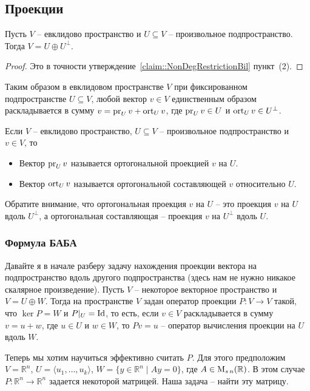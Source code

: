 \subsection{Проекции}

\begin{claim}
Пусть $V$ -- евклидово пространство и $U\subseteq V$ -- произвольное подпространство. Тогда $V = U\oplus U^\bot$.
\end{claim}
\begin{proof}
Это в точности утверждение~\ref{claim::NonDegRestrictionBil} пункт~(2).
\end{proof}

Таким образом в евклидовом пространстве $V$ при фиксированном подпространстве $U\subseteq V$, любой вектор $v\in V$ единственным образом раскладывается в сумму $v = \operatorname{pr}_U v + \operatorname{ort}_U v$, где $\operatorname{pr}_U v \in U$ и $\operatorname{ort}_U v\in U^\bot$.


\begin{definition}
Если $V$ -- евклидово пространство, $U\subseteq V$ -- произвольное подпространство и $v\in V$, то 
\begin{itemize}
\item Вектор $\operatorname{pr}_U v$ называется ортогональной проекцией $v$ на $U$.

\item Вектор $\operatorname{ort}_U v$ называется ортогональной составляющей $v$ относительно $U$.
\end{itemize}
\end{definition}

Обратите внимание, что ортогональная проекция $v$ на $U$ -- это проекция $v$ на $U$ вдоль $U^\bot$, а ортогональная составляющая -- проекция $v$ на $U^\bot$ вдоль $U$.

\subsubsection*{Формула БАБА}

Давайте я в начале разберу задачу нахождения проекции вектора на подпространство вдоль другого подпространства (здесь нам не нужно никакое скалярное произведение). Пусть $V$ -- некоторое векторное пространство и $V = U\oplus W$. Тогда на пространстве $V$ задан оператор проекции $P\colon V\to V$ такой, что $\ker P = W$ и $P|_U = \operatorname{Id}$, то есть, если $v\in V$ раскладывается в сумму $v = u + w$, где $u\in U$ и $w\in W$, то $Pv = u$ -- оператор вычисления проекции на $U$ вдоль $W$.


Теперь мы хотим научиться эффективно считать $P$. Для этого предположим $V = \mathbb R^n$, $U = \langle u_1,\ldots,u_k\rangle$, $W = \{y\in \mathbb R^n\mid Ay = 0\}$, где $A\in \operatorname{M}_{s\,n}(\mathbb R)$. В этом случае $P\colon \mathbb R^n\to \mathbb R^n$ задается некоторой матрицей. Наша задача -- найти эту матрицу.

